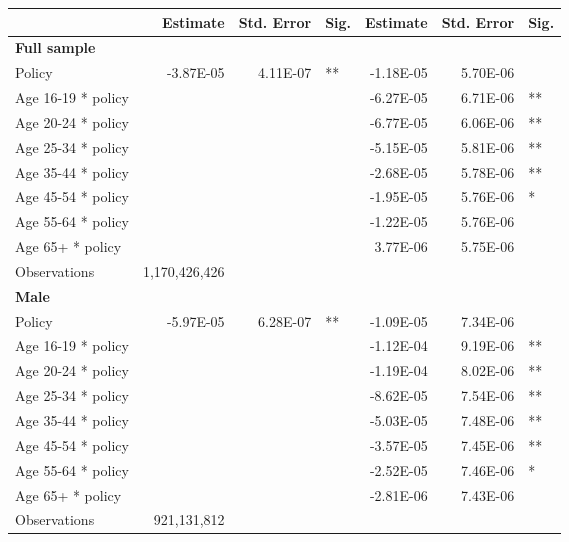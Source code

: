 
\begin{table}%
\centering 
\begin{tabular}{l r r l r r l} 

\hline 
 
 & Estimate & Std. Error & Sig. & Estimate & Std. Error & Sig. \\ 

\hline 
 
\textbf{Full sample} \\ 

Policy             &  -3.87E-05        &  4.11E-07       &   **       &  -1.18E-05        &  5.70E-06       &            \\ 
Age 16-19 * policy           & & &  &  -6.27E-05        &  6.71E-06       &   **       \\ 
Age 20-24 * policy           & & &  &  -6.77E-05        &  6.06E-06       &   **       \\ 
Age 25-34 * policy           & & &  &  -5.15E-05        &  5.81E-06       &   **       \\ 
Age 35-44 * policy           & & &  &  -2.68E-05        &  5.78E-06       &   **       \\ 
Age 45-54 * policy           & & &  &  -1.95E-05        &  5.76E-06       &    *       \\ 
Age 55-64 * policy           & & &  &  -1.22E-05        &  5.76E-06       &            \\ 
Age 65+ * policy           & & &  &  3.77E-06        &  5.75E-06       &            \\ 
Observations & 1,170,426,426 \\ 


\hline 

\textbf{Male} \\ 

Policy             &  -5.97E-05        &  6.28E-07       &   **       &  -1.09E-05        &  7.34E-06       &            \\ 
Age 16-19 * policy           & & &  &  -1.12E-04        &  9.19E-06       &   **       \\ 
Age 20-24 * policy           & & &  &  -1.19E-04        &  8.02E-06       &   **       \\ 
Age 25-34 * policy           & & &  &  -8.62E-05        &  7.54E-06       &   **       \\ 
Age 35-44 * policy           & & &  &  -5.03E-05        &  7.48E-06       &   **       \\ 
Age 45-54 * policy           & & &  &  -3.57E-05        &  7.45E-06       &   **       \\ 
Age 55-64 * policy           & & &  &  -2.52E-05        &  7.46E-06       &    *       \\ 
Age 65+ * policy           & & &  &  -2.81E-06        &  7.43E-06       &            \\ 
Observations & 921,131,812 \\ 



\end{tabular}
\end{table}

